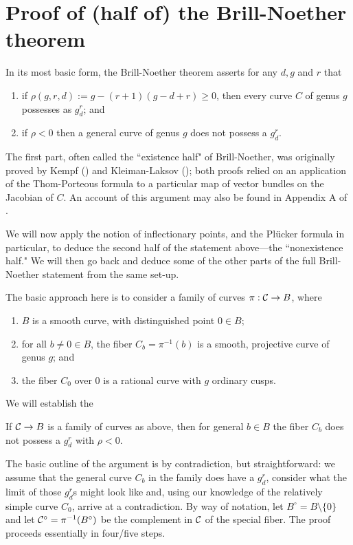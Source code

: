 \section{Proof of (half of) the Brill-Noether theorem}

In its most basic form, the Brill-Noether theorem asserts for any $d, g$ and $r$ that
\begin{enumerate}
\item if $\rho(g,r,d) := g - (r+1)(g-d+r) \geq 0$, then every curve $C$ of genus $g$ possesses as $g^r_d$; and
\item if $\rho < 0$ then a general curve of genus $g$ does not possess a $g^r_d$.
\end{enumerate}

The first part, often called the ``existence half" of Brill-Noether, was originally proved by Kempf (\cite{}) and Kleiman-Laksov (\cite{}); both proofs relied on an application of the Thom-Porteous formula to a particular map of vector bundles on the Jacobian of $C$. An account of this argument may also be found in Appendix A of \cite{}. 

We will now apply the notion of inflectionary points, and the Pl\"ucker formula in particular, to deduce the second half of the statement above---the ``nonexistence half." We will then go back and deduce some of the other parts of the full Brill-Noether statement from the same set-up.

The basic approach here is to consider a family of curves $\pi : \cC \to B$, where
\begin{enumerate}
\item $B$ is a smooth curve, with distinguished point $0 \in B$;
\item for all $b \neq 0 \in B$, the fiber $C_b = \pi^{-1}(b)$ is a smooth, projective curve of genus $g$;  and
\item the fiber $C_0$ over $0$ is a rational curve with $g$ ordinary cusps.
\end{enumerate}

We will establish the

\begin{theorem}
If $\cC \to B$ is a family of curves as above, then for general $b \in B$ the fiber $C_b$ does not possess a $g^r_d$ with $\rho < 0$.
\end{theorem}


The basic outline of the argument is by contradiction, but straightforward: we assume that the general curve $C_b$ in the family does have a $g^r_d$, consider what the limit of those $g^r_d$s might look like and, using our knowledge of the relatively simple curve $C_0$, arrive at a contradiction. By way of notation, let $B^\circ = B \setminus \{0\}$ and let $\cC^\circ = \pi^{-1}(B^\circ)$ be the complement in $\cC$ of the special fiber. The proof proceeds essentially in four/five steps.

